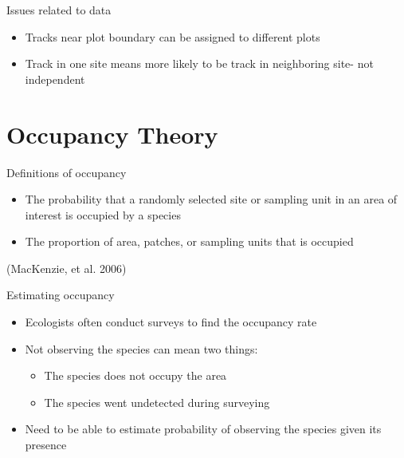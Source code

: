 \documentclass{beamer}
\begin{document}
{
	\begin{frame}
	\end{frame}
}

\begin{frame}{Issues related to data}
	\begin{itemize}
		\item Tracks near plot boundary can be assigned to different plots
		\item Track in one site means more likely to be track in neighboring site- not independent
	\end{itemize}
\end{frame}

\section{Occupancy Theory}
\begin{frame}{Definitions of occupancy}
	\begin{itemize}
		\item The probability that a randomly selected site or sampling unit in 
		an area of interest is occupied by a species
		\item The proportion of area, patches, or sampling units that is 
		occupied 	
	\end{itemize}
	(MacKenzie, et al. 2006) 
\end{frame}

\begin{frame}{Estimating occupancy}
	\begin{itemize}
		\item Ecologists often conduct surveys to find the occupancy rate
		\item Not observing the species can mean two things:
		\begin{itemize}
			\item The species does not occupy the area
			\item The species went undetected during surveying
		\end{itemize}
		\item Need to be able to estimate probability of observing the species 
		given its presence
	\end{itemize}
\end{frame}
\end{document}

